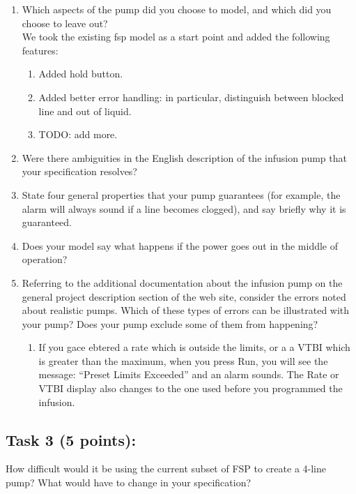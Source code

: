 \documentclass{article}
\newcommand{\head}{\subsection*}
\begin{document}
\begin{enumerate}
\item Which aspects of the pump did you choose to model, and which did you choose to leave out? \\
  We took the existing fsp model as a start point and added the following features: \\
  \begin{enumerate}
  \item Added hold button.
  \item Added better error handling: in particular, distinguish between blocked line and out of liquid.
    \item TODO: add more.
  \end{enumerate}
    \item Were there ambiguities in the English description of the infusion pump that your specification resolves?
    \item State four general properties that your pump guarantees (for example, the alarm will always sound if a line becomes clogged), and say briefly why it is guaranteed.
    \item Does your model say what happens if the power goes out in the middle of operation?
    \item Referring to the additional documentation about the infusion pump on the general project description section of the web site, consider the errors noted about realistic pumps. Which of these types of errors can be illustrated with your pump? Does your pump exclude some of them from happening? \\
      \begin{enumerate}
      \item If you gace ebtered a rate which is outside the limits, or a a VTBI which is greater than the maximum, when you press Run, you will see the message: ``Preset Limits Exceeded'' and an alarm sounds. The Rate or VTBI display also changes to the one used before you programmed the infusion.
      \end{enumerate}

\end{enumerate}


\head{Task 3 (5 points):}


How difficult would it be using the current subset of FSP to create
a 4-line pump? What would have to change in your specification?
\end{document}
